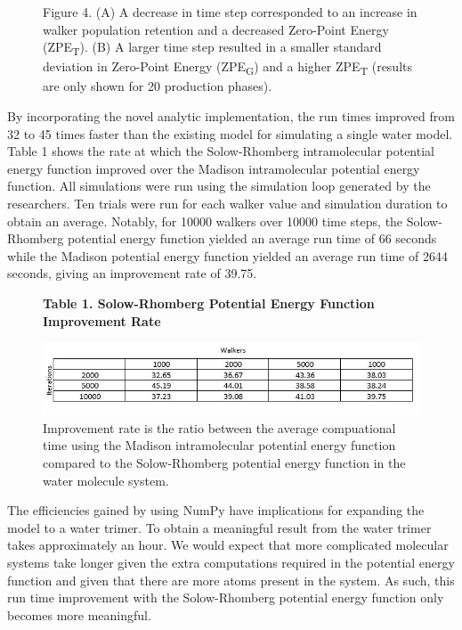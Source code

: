 \documentclass[journal=jacsat,manuscript=article]{achemso}
\newcommand*{\figuretitle}[1]{%
    {\centering%
    \textbf{#1}%
    \par\medskip}%
}
\begin{document}
\begin{figure}[H]
\begin{subfigure}{.5\textwidth}
\end{subfigure}
\caption{Figure 4. (A) A decrease in time step corresponded to an increase in walker population retention and a decreased Zero-Point Energy (ZPE\textsubscript{T}). (B) A larger time step resulted in a smaller standard deviation in Zero-Point Energy (ZPE\textsubscript{G}) and a higher ZPE\textsubscript{T} (results are only shown for 20 production phases).}
\end{figure}

By incorporating the novel analytic implementation, the run times improved from 32 to 45 times faster than the existing model for simulating a single water model. Table 1 shows the rate at which the Solow-Rhomberg intramolecular potential energy function improved over the Madison intramolecular potential energy function. All simulations were run using the simulation loop generated by the researchers. Ten trials were run for each walker value and simulation duration to obtain an average. Notably, for 10000 walkers over 10000 time steps, the Solow-Rhomberg potential energy function yielded an average run time of 66 seconds while the Madison potential energy function yielded an average run time of 2644 seconds, giving an improvement rate of 39.75.

\begin{figure}[H]
\centering
\figuretitle{Table 1. Solow-Rhomberg Potential Energy Function Improvement Rate}
\caption{Improvement rate is the ratio between the average compuational time using the Madison intramolecular potential energy function compared to the Solow-Rhomberg potential energy function in the water molecule system.}
\includegraphics[width=\linewidth]{figures/Table_1.jpg}
\end{figure}

The efficiencies gained by using NumPy have implications for expanding the model to a water trimer. To obtain a meaningful result from the water trimer takes approximately an hour. We would expect that more complicated molecular systems take longer given the extra computations required in the potential energy function and given that there are more atoms present in the system. As such, this run time improvement with the Solow-Rhomberg potential energy function only becomes more meaningful.
\end{document}
